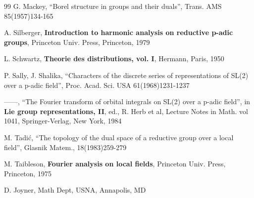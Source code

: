 \begin{thebibliography}{99}
  G. Mackey, ``Borel structure in groups and their duals'', Trans. AMS
85(1957)134-165

  A. Silberger, {\bf Introduction to harmonic analysis on reductive
    p-adic groups}, Princeton Univ. Press, Princeton, 1979

  L. Schwartz, {\bf Theorie des distributions, vol. I},
  Hermann, Paris, 1950

  P. Sally, J. Shalika, ``Characters of the discrete series of
representations of SL(2) over a p-adic field'', Proc. Acad. Sci. USA
61(1968)1231-1237

  ------, ``The Fourier transform of orbital integrals on SL(2) over a
  p-adic field'', in {\bf Lie group representations, II},
  ed., R. Herb et al, Lecture Notes in Math. vol 1041,
Springer-Verlag, New York, 1984

  M. Tadi\'c, ``The topology of the dual space of a reductive group over a
local field'', Glasnik Matem., 18(1983)259-279

  M. Taibleson, {\bf Fourier analysis on local fields},
  Princeton Univ. Press, Princeton, 1975
 
\end{thebibliography}
D. Joyner, Math Dept, USNA, Annapolis, MD 


